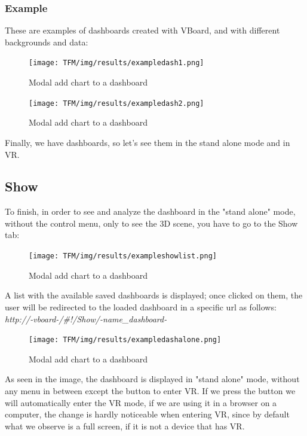 \documentclass[a4paper, 12pt]{book}
\begin{document}
\subsubsection{Example}

These are examples of dashboards created with VBoard, and with different backgrounds and data:

\begin{figure}[H]
  \centering
  \texttt{[image: TFM/img/results/exampledash1.png]}
  \caption{Modal add chart to a dashboard}
  \label{fig:onlynodes}
\end{figure}
\begin{figure}[H]
  \centering
  \texttt{[image: TFM/img/results/exampledash2.png]}
  \caption{Modal add chart to a dashboard}
  \label{fig:onlynodes}
\end{figure}

Finally, we have dashboards, so let's see them in the stand alone mode and in VR.

\subsection{Show}

To finish, in order to see and analyze the dashboard in the "stand alone" mode, without the control menu, only to see the 3D scene, you have to go to the Show tab:

\begin{figure}[H]
  \centering
  \texttt{[image: TFM/img/results/exampleshowlist.png]}
  \caption{Modal add chart to a dashboard}
  \label{fig:onlynodes}
\end{figure}

A list with the available saved dashboards is displayed; once clicked on them, the user will be redirected to the loaded dashboard in a specific url as follows: \textit{http://-vboard-/\#!/Show/-name\_dashboard-}

\begin{figure}[H]
  \centering
  \texttt{[image: TFM/img/results/exampledashalone.png]}
  \caption{Modal add chart to a dashboard}
  \label{fig:onlynodes}
\end{figure}

As seen in the image, the dashboard is displayed in "stand alone" mode, without any menu in between except the button to enter VR. If we press the button we will automatically enter the VR mode, if we are using it in a browser on a computer, the change is hardly noticeable when entering VR, since by default what we observe is a full screen, if it is not a device that has VR.
\end{document}
